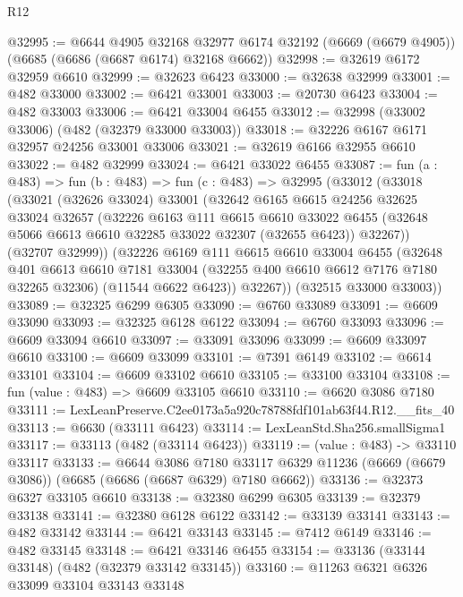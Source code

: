\begin{lexlean}{R12}
\begin{coremodule}
@32995 := @6644
    @4905
    @32168
    @32977
    @6174
    @32192
    (@6669 (@6679 @4905))
    (@6685 (@6686 (@6687 @6174) @32168 @6662))
@32998 := @32619 @6172 @32959 @6610
@32999 := @32623 @6423
@33000 := @32638 @32999
@33001 := @482 @33000
@33002 := @6421 @33001
@33003 := @20730 @6423
@33004 := @482 @33003
@33006 := @6421 @33004 @6455
@33012 := @32998 (@33002 @33006) (@482 (@32379 @33000 @33003))
@33018 := @32226 @6167 @6171 @32957 @24256 @33001 @33006
@33021 := @32619 @6166 @32955 @6610
@33022 := @482 @32999
@33024 := @6421 @33022 @6455
@33087 := fun (a : @483) =>
  fun (b : @483) =>
  fun (c : @483) =>
  @32995
    (@33012
      (@33018
        (@33021
          (@32626 @33024)
          @33001
          (@32642
            @6165
            @6615
            @24256
            @32625
            @33024
            @32657
            (@32226
              @6163
              @111
              @6615
              @6610
              @33022
              @6455
              (@32648 @5066 @6613 @6610 @32285 @33022 @32307 (@32655 @6423))
              @32267))
          (@32707 @32999))
        (@32226
          @6169
          @111
          @6615
          @6610
          @33004
          @6455
          (@32648
            @401
            @6613
            @6610
            @7181
            @33004
            (@32255 @400 @6610 @6612 @7176 @7180 @32265 @32306)
            (@11544 @6622 @6423))
          @32267))
      (@32515 @33000 @33003))
@33089 := @32325 @6299 @6305
@33090 := @6760 @33089
@33091 := @6609 @33090
@33093 := @32325 @6128 @6122
@33094 := @6760 @33093
@33096 := @6609 @33094 @6610
@33097 := @33091 @33096
@33099 := @6609 @33097 @6610
@33100 := @6609 @33099
@33101 := @7391 @6149
@33102 := @6614 @33101
@33104 := @6609 @33102 @6610
@33105 := @33100 @33104
@33108 := fun (value : @483) => @6609 @33105 @6610
@33110 := @6620 @3086 @7180
@33111 := LexLeanPreserve.C2ee0173a5a920c78788fdf101ab63f44.R12.__fits_40
@33113 := @6630 (@33111 @6423)
@33114 := LexLeanStd.Sha256.smallSigma1
@33117 := @33113 (@482 (@33114 @6423))
@33119 := (value : @483) -> @33110 @33117
@33133 := @6644
    @3086
    @7180
    @33117
    @6329
    @11236
    (@6669 (@6679 @3086))
    (@6685 (@6686 (@6687 @6329) @7180 @6662))
@33136 := @32373 @6327 @33105 @6610
@33138 := @32380 @6299 @6305
@33139 := @32379 @33138
@33141 := @32380 @6128 @6122
@33142 := @33139 @33141
@33143 := @482 @33142
@33144 := @6421 @33143
@33145 := @7412 @6149
@33146 := @482 @33145
@33148 := @6421 @33146 @6455
@33154 := @33136 (@33144 @33148) (@482 (@32379 @33142 @33145))
@33160 := @11263 @6321 @6326 @33099 @33104 @33143 @33148

\end{coremodule}
\end{lexlean}
